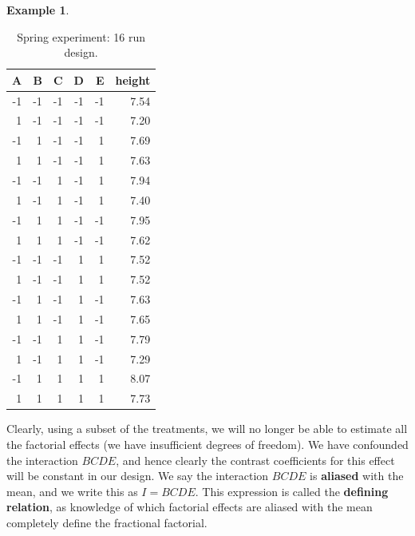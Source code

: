 \documentclass[
]{book}
\newenvironment{Shaded}{\begin{snugshade}}{\end{snugshade}}
\newcommand{\ControlFlowTok}[1]{\textcolor[rgb]{0.13,0.29,0.53}{\textbf{#1}}}
\newcommand{\FunctionTok}[1]{\textcolor[rgb]{0.00,0.00,0.00}{#1}}
\newcommand{\NormalTok}[1]{#1}
\newcommand{\OtherTok}[1]{\textcolor[rgb]{0.56,0.35,0.01}{#1}}
\newcommand{\SpecialCharTok}[1]{\textcolor[rgb]{0.00,0.00,0.00}{#1}}
\theoremstyle{definition}
\theoremstyle{definition}
\newtheorem{example}{Example}[chapter]
\theoremstyle{definition}
\theoremstyle{definition}
\theoremstyle{remark}
\begin{document}
\begin{example}
\begin{table}
\caption{\label{tab:spring-data}Spring experiment: 16 run design.}
\centering
\begin{tabular}[t]{r|r|r|r|r|r}
\hline
A & B & C & D & E & height\\
\hline
-1 & -1 & -1 & -1 & -1 & 7.54\\
\hline
1 & -1 & -1 & -1 & -1 & 7.20\\
\hline
-1 & 1 & -1 & -1 & 1 & 7.69\\
\hline
1 & 1 & -1 & -1 & 1 & 7.63\\
\hline
-1 & -1 & 1 & -1 & 1 & 7.94\\
\hline
1 & -1 & 1 & -1 & 1 & 7.40\\
\hline
-1 & 1 & 1 & -1 & -1 & 7.95\\
\hline
1 & 1 & 1 & -1 & -1 & 7.62\\
\hline
-1 & -1 & -1 & 1 & 1 & 7.52\\
\hline
1 & -1 & -1 & 1 & 1 & 7.52\\
\hline
-1 & 1 & -1 & 1 & -1 & 7.63\\
\hline
1 & 1 & -1 & 1 & -1 & 7.65\\
\hline
-1 & -1 & 1 & 1 & -1 & 7.79\\
\hline
1 & -1 & 1 & 1 & -1 & 7.29\\
\hline
-1 & 1 & 1 & 1 & 1 & 8.07\\
\hline
1 & 1 & 1 & 1 & 1 & 7.73\\
\hline
\end{tabular}
\end{table}

Clearly, using a subset of the treatments, we will no longer be able to estimate all the factorial effects (we have insufficient degrees of freedom). We have confounded the interaction \(BCDE\), and hence clearly the contrast coefficients for this effect will be constant in our design. We say the interaction \(BCDE\) is \textbf{aliased} with the mean, and we write this as \(I = BCDE\). This expression is called the \textbf{defining relation}, as knowledge of which factorial effects are aliased with the mean completely define the fractional factorial.

\begin{Shaded}
\end{Shaded}


\end{example}
\end{document}
